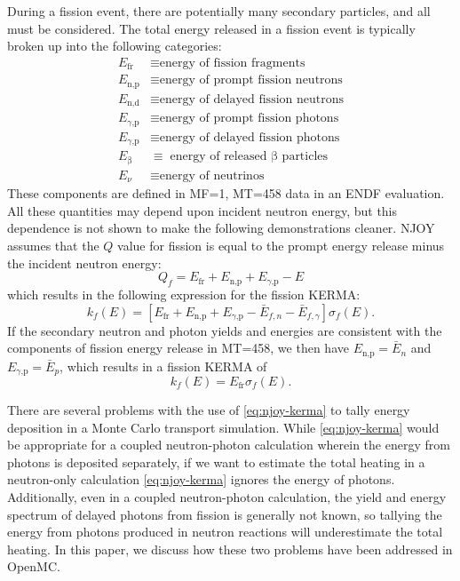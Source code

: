 \documentclass{anstrans}
\newcommand{\efr}{E_\text{fr}}
\newcommand{\enp}{E_\text{n,p}}
\newcommand{\ened}{E_\text{n,d}}
\newcommand{\egp}{E_\text{$\gamma$,p}}
\newcommand{\egd}{E_\text{$\gamma$,p}}
\newcommand{\eb}{E_\upbeta}
\newcommand{\enu}{E_\nu}
\begin{document}
During a fission event, there are potentially many secondary particles, and all
must be considered. The total energy released in a fission event is typically
broken up into the following categories:
\begin{equation*}
\begin{split}
  \efr  &\equiv \text{energy of fission fragments} \\
  \enp  &\equiv \text{energy of prompt fission neutrons} \\
  \ened &\equiv \text{energy of delayed fission neutrons} \\
  \egp  &\equiv \text{energy of prompt fission photons} \\
  \egd  &\equiv \text{energy of delayed fission photons} \\
  \eb   &\equiv \text{energy of released $\upbeta$ particles} \\
  \enu  &\equiv \text{energy of neutrinos}
\end{split}
\end{equation*}
These components are defined in MF=1, MT=458 data in an ENDF evaluation. All
these quantities may depend upon incident neutron energy, but this dependence is
not shown to make the following demonstrations cleaner. NJOY assumes that the
$Q$ value for fission is equal to the prompt energy release minus the incident
neutron energy:
\begin{equation}
    Q_f = \efr + \enp + \egp - E
\end{equation}
which results in the following expression for the fission KERMA:
\begin{equation}
    k_f(E) = \left[\efr + \enp + \egp - \bar{E}_{f,n} - \bar{E}_{f,\gamma}\right]\sigma_f(E).
\end{equation}
If the secondary neutron and photon yields and energies are consistent with the
components of fission energy release in MT=458, we then have $\enp = \bar{E}_n$
and $\egp = \bar{E}_p$, which results in a fission KERMA of
\begin{equation}
    \label{eq:njoy-kerma}
    k_f(E) = \efr \sigma_f(E).
\end{equation}

There are several problems with the use of \cref{eq:njoy-kerma} to tally energy
deposition in a Monte Carlo transport simulation. While \cref{eq:njoy-kerma}
would be appropriate for a coupled neutron-photon calculation wherein the energy
from photons is deposited separately, if we want to estimate the total heating
in a neutron-only calculation \cref{eq:njoy-kerma} ignores the energy of
photons. Additionally, even in a coupled neutron-photon calculation, the yield
and energy spectrum of delayed photons from fission is generally not known, so
tallying the energy from photons produced in neutron reactions will
underestimate the total heating. In this paper, we discuss how these two
problems have been addressed in OpenMC.
\end{document}

